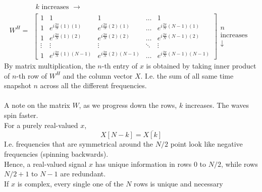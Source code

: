 \documentclass[../linear-algebra.tex]{subfiles}
\begin{document}
% 
$$
W^H =
\begin{matrix}
  \begin{matrix} k \text{ increases } \longrightarrow \end{matrix} \\
  \begin{bmatrix} 
    1 & 1 & 1 & \dots & 1 \\ 
    1 & e^{i\frac{2\pi}{N}(1)(1)} & e^{i\frac{2\pi}{N}(2)(1)} & \dots & e^{i\frac{2\pi}{N}(N-1)(1)} \\ 
    1 & e^{i\frac{2\pi}{N}(1)(2)} & e^{i\frac{2\pi}{N}(2)(2)} & \dots & e^{i\frac{2\pi}{N}(N-1)(2)} \\ 
    \vdots & \vdots & \vdots & \ddots & \vdots \\ 
    1 & e^{i\frac{2\pi}{N}(1)(N-1)} & e^{i\frac{2\pi}{N}(2)(N-1)} & \dots & e^{i\frac{2\pi}{N}(N-1)(N-1)} 
  \end{bmatrix}
  \begin{matrix} 
    n \\ \text{increases} \\ \downarrow 
  \end{matrix} 
\end{matrix}
$$
By matrix multiplication, the $n$-th entry of $x$ is obtained by taking inner product of $n$-th row of $W^H$ and the column vector $X$.
I.e. the sum of all same time snapshot $n$ across all the different frequencies.\\
\\
A note on the matrix $W$, as we progress down the rows, $k$ increases. The waves spin faster.\\
For a purely real-valued $x$,
$$X[N-k] = \overline{X[k]}$$
I.e. frequencies that are symmetrical around the $N/2$ point look like negative frequencies (spinning backwards).\\
Hence, a real-valued signal $x$ has unique information in rows 0 to $N/2$, while rows $N/2 + 1$ to $N-1$ are redundant.\\
If $x$ is complex, every single one of the $N$ rows is unique and necessary
\end{document}
